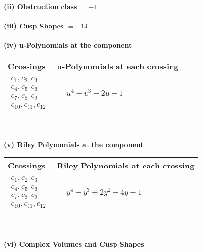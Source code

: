 \documentclass[1p]{elsarticle_modified}
\theoremstyle{definition}
\begin{document}
\flushleft \textbf{(ii) Obstruction class $= -1$}\\~\\
\flushleft \textbf{(iii) Cusp Shapes $= -14$}\\~\\
\newpage\renewcommand{\arraystretch}{1}
\flushleft \textbf{(iv) u-Polynomials at the component}\newline \\
\begin{tabular}{m{50pt}|m{274pt}}
Crossings & \hspace{64pt}u-Polynomials at each crossing \\
\hline $$\begin{aligned}c_{1},c_{2},c_{3}\\c_{4},c_{5},c_{6}\\c_{7},c_{8},c_{9}\\c_{10},c_{11},c_{12}\end{aligned}$$&$\begin{aligned}
&u^4+u^3-2 u-1
\end{aligned}$\\
\hline
\end{tabular}\\~\\
\newpage\renewcommand{\arraystretch}{1}
\flushleft \textbf{(v) Riley Polynomials at the component}\newline \\
\begin{tabular}{m{50pt}|m{274pt}}
Crossings & \hspace{64pt}Riley Polynomials at each crossing \\
\hline $$\begin{aligned}c_{1},c_{2},c_{3}\\c_{4},c_{5},c_{6}\\c_{7},c_{8},c_{9}\\c_{10},c_{11},c_{12}\end{aligned}$$&$\begin{aligned}
&y^4- y^3+2 y^2-4 y+1
\end{aligned}$\\
\hline
\end{tabular}\\~\\
\newpage\flushleft \textbf{(vi) Complex Volumes and Cusp Shapes}
\end{document}
